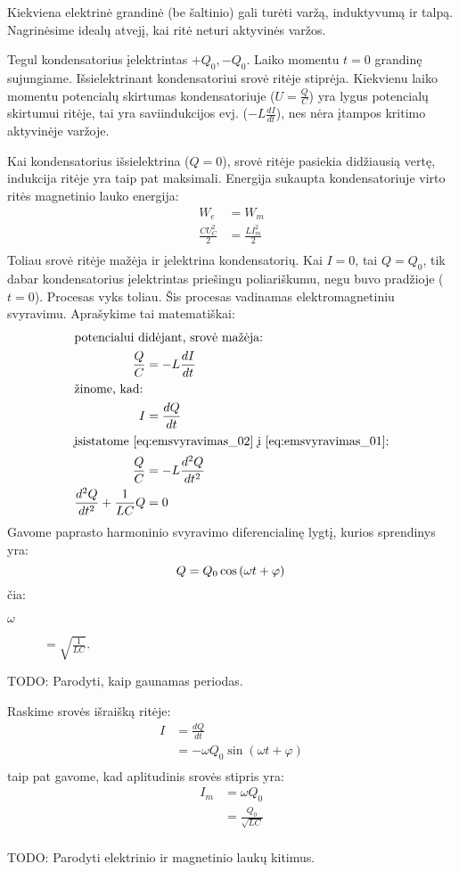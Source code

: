 Kiekviena elektrinė grandinė (be šaltinio) gali turėti varžą, induktyvumą
ir talpą. Nagrinėsime idealų atvejį, kai ritė neturi aktyvinės varžos.

Tegul kondensatorius įelektrintas $+Q_{0}, -Q_{0}$. Laiko momentu $t=0$
grandinę sujungiame. Išsielektrinant kondensatoriui srovė ritėje stiprėja.
Kiekvienu laiko momentu potencialų skirtumas kondensatoriuje
($U = \frac{Q}{C}$) yra lygus potencialų skirtumui ritėje, tai yra
saviindukcijos evj. ($-L\frac{dI}{dt}$), nes nėra įtampos kritimo
aktyvinėje varžoje.

Kai kondensatorius išsielektrina ($Q = 0$), srovė ritėje pasiekia
didžiausią vertę, indukcija ritėje yra taip pat maksimali. Energija
sukaupta kondensatoriuje virto ritės magnetinio lauko energija:
\begin{align*}
  W_{e} &= W_{m} \\
  \frac{CU_{C}^{2}}{2} &= \frac{LI_{m}^{2}}{2} \\
\end{align*}
Toliau srovė ritėje mažėja ir įelektrina kondensatorių. Kai $I = 0$, 
tai $Q = Q_{0}$, tik dabar kondensatorius įelektrintas priešingu
poliariškumu, negu buvo pradžioje ($t = 0$). Procesas vyks toliau.
Šis procesas vadinamas elektromagnetiniu svyravimu. Aprašykime
tai matematiškai:
\begin{align}
  \intertext{potencialui didėjant, srovė mažėja:}
  \frac{Q}{C}
    &= - L\frac{dI}{dt} \label{eq:emsvyravimas_01} \\
  \intertext{žinome, kad:}
  I
    &= \frac{dQ}{dt} \label{eq:emsvyravimas_02} \\
  \intertext{įsistatome \ref{eq:emsvyravimas_02} į
  \ref{eq:emsvyravimas_01}:}
  \frac{Q}{C}
    &= - L \frac{d^{2}Q}{dt^{2}} \\
  \frac{d^{2}Q}{dt^{2}} + \frac{1}{LC}Q &= 0 \\
\end{align}
Gavome paprasto harmoninio svyravimo diferencialinę lygtį, kurios
sprendinys yra:
\begin{equation*}
  Q = Q_{0} \cos \left( \omega t + \varphi \right) \\
\end{equation*}
čia:
\begin{description}
  \item[$\omega$] $= \sqrt{\frac{1}{LC}}$.
\end{description}

TODO: Parodyti, kaip gaunamas periodas.

Raskime srovės išraišką ritėje:
\begin{align*}
  I
    &= \frac{dQ}{dt} \\
    &= - \omega Q_{0} \sin \left( \omega t + \varphi \right) \\
\end{align*}
taip pat gavome, kad aplitudinis srovės stipris yra:
\begin{align*}
  I_{m}
    &= \omega Q_{0} \\
    &= \frac{Q_{0}}{\sqrt{LC}} \\
\end{align*}

TODO: Parodyti elektrinio ir magnetinio laukų kitimus.
